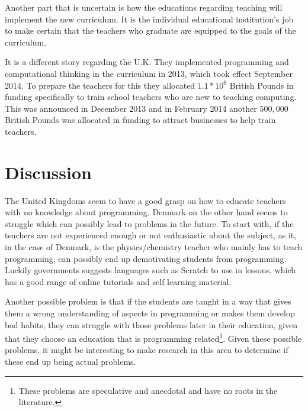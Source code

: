 Another part that is uncertain is how the educations regarding teaching will implement the new curriculum. It is the individual educational institution's job to make certain that the teachers who graduate are equipped to the goals of the curriculum\cite{2}. 

It is a different story regarding the U.K. They implemented programming and computational thinking in the curriculum in 2013, which took effect September 2014\cite{3}. To prepare the teachers for this they allocated $1.1*10^6$ British Pounds in funding specifically to train school teachers who are new to teaching computing\cite{4}. This was announced in December 2013 and in February 2014 another $500,000$ British Pounds was allocated in funding to attract businesses to help train teachers\cite{5}.

\section{Discussion}
The United Kingdoms seem to have a good grasp on how to educate teachers with no knowledge about programming. Denmark on the other hand seems to struggle which can possibly lead to problems in the future. To start with, if the teachers are not experienced enough or not enthusiastic about the subject, as it, in the case of Denmark, is the physics/chemistry teacher who mainly has to teach programming, can possibly end up demotivating students from programming. Luckily governments suggests languages such as Scratch to use in lessons, which has a good range of online tutorials and self learning material.

Another possible problem is that if the students are taught in a way that gives them a wrong understanding of aspects in programming or makes them develop bad habits, they can struggle with those problems later in their education, given that they choose an education that is programming related\footnote{These problems are speculative and anecdotal and have no roots in the literature.}. Given these possible problems, it might be interesting to make research in this area to determine if these end up being actual problems.

